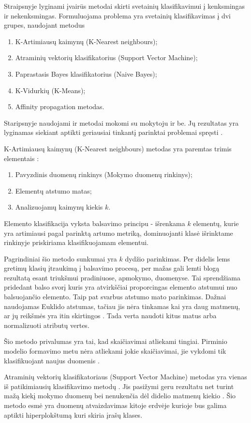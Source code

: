 Straipsnyje lyginami įvairūs metodai skirti svetainių klasifikavimui į kenksmingas ir nekenksmingas. Formuluojama problema yra svetainių klasifikavimas į dvi grupes, naudojant metodus \cite{comp}
\begin{enumerate}
 \item K-Artimiausų kaimynų (K-Nearest neighbours);
 \item Atraminių vektorių klasifikatorius (Support Vector Machine);
 \item Paprastasis Bayes klasifikatorius (Naive Bayes);
 \item K-Vidurkių (K-Means);
 \item Affinity propagation metodas.
\end{enumerate}

Staripsnyje naudojami ir metodai mokomi su mokytoju ir be. Jų rezultatas yra lyginamas siekiant aptikti geriausiai tinkantį parinktai problemai spręsti \cite{comp}.

K-Artimiausų kaimynų (K-Nearest neighbours) metodas yra paremtas trimis elementais \cite{Wu2008}:
\begin{enumerate}
    \item Pavyzdinis duomenų rinkinys (Mokymo duomenų rinkinys);
    \item Elementų atstumo matas;
    \item Analizuojamų kaimynų kiekis $k$.
\end{enumerate}
Elemento klasifikacija vyksta balsavimo principu - išrenkama $k$ elementų, kurie yra artimiausi pagal parinktą artumo metriką, dominuojanti klasė išrinktame rinkinyje priskiriama klasifikuojamam elementui.

Pagrindiniai šio metodo sunkumai yra $k$ dydžio parinkimas. Per didelis lems gretimų klasių įtraukimą į balsavimo procesą, per mažas gali lemti blogą rezultatą esant triukšmui pradiniuose, apmokymo, duomenyse. Tai sprendžiama pridedant balso svorį \cite{Wu2008} kuris yra atvirkščiai proporcingas elemento atstumui nuo balsuojančio elemento. Taip pat svarbus atstumo mato parinkimas. Dažnai naudojamas Euklido atstumas, tačiau jis nėra tinkamas kai yra daug matmenų, ar jų reikšmės yra itin skirtingos \cite{Wu2008}. Tada verta naudoti kitus matus arba normalizuoti atributų vertes.

Šio metodo privalumas yra tai,  kad skaičiavimai atliekami tingiai. Pirminio modelio formavimo metu nėra atliekami jokie skaičiavimai, jie vykdomi tik klasifikuojant naujus duomenis \cite{Wu2008}.

Atraminių vektorių klasifikatoriaus (Support Vector Machine) metodas yra vienas iš patikimiausių klasifikavimo metodų \cite{Wu2008}. Jis pasižymi geru rezultatu net turint mažą kiekį mokymo duomenų bei nenukenčia dėl didelio matmenų kiekio \cite{Wu2008}. Šio metodo esmė yra duomenų atvaizdavimas kitoje erdvėje kurioje bus galima aptikti hiperplokštumą kuri skiria įrašų klases.

